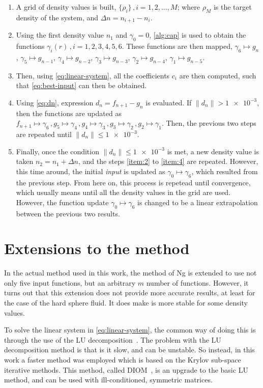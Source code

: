 \begin{enumerate}
    \item \label{item:1} A grid of density values is built, \(\{\rho_i\} \, , i=1,2,\dots,M\); where \(\rho_{M}\) is the target density of the system, and \(\Delta n = n_{i+1} - n_{i}\).
    \item \label{item:2} Using the first density value \(n_1\) and \(\gamma_0 = 0\), \autoref{alg:cap} is used to obtain the functions \(\gamma_i (r) \, , i=1,2,3,4,5,6\). These functions are then mapped, \(\gamma_6 \mapsto g_n\), \(\gamma_5 \mapsto g_{n-1}\), \(\gamma_4 \mapsto g_{n-2}\), \(\gamma_3 \mapsto g_{n-3}\), \(\gamma_2 \mapsto g_{n-4}\), \(\gamma_1 \mapsto g_{n-5}\).
    \item \label{item:3} Then, using \autoref{eq:linear-system}, all the coefficients \(c_i\) are then computed, such that \autoref{eq:best-input} can then be obtained.
    \item \label{item:4} Using \autoref{eq:dn}, expression \(d_n = f_{n+1} - g_n\) is evaluated. If \(\lVert d_n \rVert > \num{1e-3}\), then the functions are updated as \(f_{n+1} \mapsto \gamma_6 \, , g_5 \mapsto \gamma_4 \, , g_4 \mapsto \gamma_3 \, , g_3 \mapsto \gamma_2 \, , g_2 \mapsto \gamma_1\). Then, the previous two steps are repeated until \(\lVert d_n \rVert \leq \num{1e-3}\).
    \item \label{item:5} Finally, once the condition \(\lVert d_n \rVert \leq \num{1e-3}\) is met, a new density value is taken \(n_2 = n_1 + \Delta n\), and the steps \ref{item:2} to \ref{item:4} are repeated. However, this time around, the initial \emph{input} is updated as \(\gamma_{0} \mapsto \gamma_6\), which resulted from the previous step. From here on, this process is repetead until convergence, which usually means until all the density values in the grid are used. However, the function update \(\gamma_{0} \mapsto \gamma_6\) is changed to be a linear extrapolation between the previous two results.
\end{enumerate}

\section{Extensions to the method}
In the actual method used in this work, the method of Ng is extended to use not only five 
input functions, but an arbitrary \(m\) number of functions. However, it turns out that 
this extension does not provide more accurate results, at least for the case of the hard 
sphere fluid. It does make is more stable for some density values.

To solve the linear system in \autoref{eq:linear-system}, the common way of doing this is 
through the use of the LU decomposition~\cite{trefethenNumericalLinearAlgebra1997}. The 
problem with the LU decomposition method is that is it slow, and can be unstable. So 
instead, in this work a faster method was employed which is based on the Krylov sub-space 
iterative methods. This method, called DIOM~\cite{saadPracticalUseKrylov1984a}, is an 
upgrade to the basic LU method, and can be used with ill-conditioned, symmetric matrices.